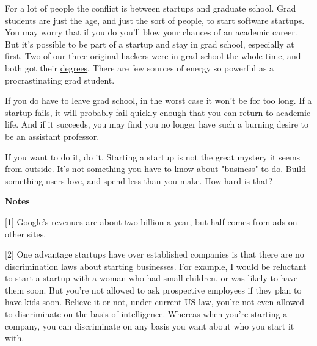 For
                    a lot of people the conflict is between startups and
                    graduate school. Grad students are just the age, and just
                    the sort of people, to start software startups. You may
                    worry that if you do you'll blow your chances of an academic
                    career. But it's possible to be part of a startup and stay
                    in grad school, especially at first. Two of our three
                    original hackers were in grad school the whole time, and
                    both got their \href{http://www.paulgraham.com/tlbphd.html}{degrees}. There are
                    few sources of energy so powerful as a procrastinating grad
                    student.

If you do have to leave grad school, in
                    the worst case it won't be for too long. If a startup fails,
                    it will probably fail quickly enough that you can return to
                    academic life. And if it succeeds, you may find you no
                    longer have such a burning desire to be an assistant
                    professor.

If you want to do it, do it. Starting
                    a startup is not the great mystery it seems from outside.
                    It's not something you have to know about "business" to do.
                    Build something users love, and spend less than you make.
                    How hard is that?







\textbf{Notes}

[1] Google's revenues are about two billion a
                    year, but half comes from ads on other sites.

[2]
                    One advantage startups have over established companies is
                    that there are no discrimination laws about starting
                    businesses. For example, I would be reluctant to start a
                    startup with a woman who had small children, or was likely
                    to have them soon. But you're not allowed to ask prospective
                    employees if they plan to have kids soon. Believe it or not,
                    under current US law, you're not even allowed to
                    discriminate on the basis of intelligence. Whereas when
                    you're starting a company, you can discriminate on any basis
                    you want about who you start it with.

